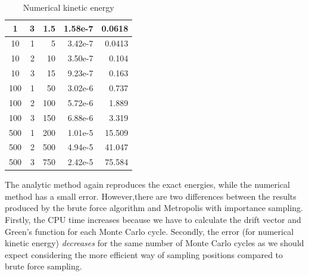 \documentclass[english, a4paper]{article}
\begin{document}
\begin{table}[H]
\begin{minipage}{.5\linewidth}
\begin{tabular}{ | c | r | r | r | r |}
    1& 3& 1.5& 1.58e-7&  0.0618\\*
    \hline
    10& 1& 5& 3.42e-7&  0.0413\\*
    \hline
    10& 2& 10& 3.50e-7&  0.104\\*
    \hline
    10& 3& 15& 9.23e-7&  0.163\\*
    \hline
    100& 1& 50& 3.02e-6&  0.737\\*
    \hline
    100& 2& 100& 5.72e-6&  1.889\\*
    \hline
    100& 3& 150& 6.88e-6&  3.319\\*
    \hline
    500& 1& 200& 1.01e-5&  15.509\\*
    \hline
    500& 2& 500& 4.94e-5&  41.047\\*
    \hline
    500& 3& 750& 2.42e-5&  75.584\\*
    \hline
  \end{tabular}
  \caption{Numerical kinetic energy}
  \label{tab:Tabell4}
  \end{minipage}
\end{table}
The analytic method again reproduces the exact energies, while the numerical method has a small error. 
However,there are two differences between the results produced by the brute force algorithm and 
Metropolis with importance sampling.
Firstly, the CPU time increases because we have to calculate the drift vector and Green's function for 
each Monte Carlo cycle.
Secondly, the error (for numerical kinetic energy) \textit{decreases} for the same number of Monte Carlo cycles
as we should expect 
considering the more efficient
way of sampling positions compared to brute force sampling. \\
\end{document}
